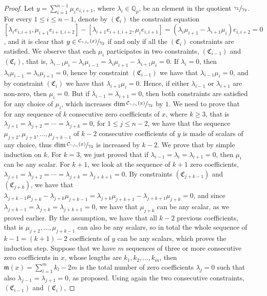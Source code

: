 \documentclass[12pt,fleqn]{article}
\begin{document}
\begin{proof}
Let $y=\sum_{i=1}^{n-1}\mu_i e_{i,i+1}$, where $\lambda_i\in\mathbb{Q}_p$, be an element in the quotient $\sfrac{\gamma_1}{\gamma_2}$.
For every $1\leq i\leq n-1$, denote by $(\mathfrak{C}_i)$ the constraint equation $[\lambda_i e_{i,i+1},\mu_{i+1}e_{i+1,i+2}]-[\lambda_{i+1}e_{i+1,i+2},\mu_i e_{i,i+1}]=(\lambda_i\mu_{i+1}-\lambda_{i+1}\mu_i)e_{i,i+2}=0$, and it is clear that $y\in\sfrac{\mathcal{C}_{\sfrac{\gamma_1}{\gamma_3}}(x)}{\gamma_2}$ if and only if all the $(\mathfrak{C}_i)$ constraints are satisfied. We observe that each $\mu_i$ participates in two constraints, $(\mathfrak{C}_{i-1})$ and $(\mathfrak{C}_i)$, that is, $\lambda_{i-1}\mu_i-\lambda_i\mu_{i-1}=\lambda_i\mu_{i+1}-\lambda_{i+1}\mu_i=0$. If $\lambda_i=0$, then $\lambda_i\mu_{i-1}=\lambda_i\mu_{i+1}=0$, hence by constraint $(\mathfrak{C}_{i-1})$ we have that $\lambda_{i-1}\mu_i=0$, and by constraint $(\mathfrak{C}_i)$ we have that $\lambda_{i+1}\mu_i=0$. Hence, if either $\lambda_{i-1}$ or $\lambda_{i+1}$ are non-zero, then $\mu_i=0$. But if $\lambda_{i-1}=\lambda_{i+1}=0$, then both constraints are satisfied for any choice of $\mu_i$, which increases $\dim\sfrac{\mathcal{C}_{\sfrac{\gamma_1}{\gamma_3}}(x)}{\gamma_2}$ by $1$. We need to prove that for any sequence of $k$ consecutive zero coefficients of $x$, where $k\geq 3$, that is $\lambda_{j+1}=\lambda_{j+2}=\cdots=\lambda_{j+k}=0$, for $1\leq j\leq n-2$, we have that the sequence $\mu_{j+2},\mu_{j+3},\dots,\mu_{j+k-1}$ of $k-2$ consecutive coefficients of $y$ is made of scalars of any choice, thus $\dim\sfrac{\mathcal{C}_{\sfrac{\gamma_1}{\gamma_3}}(x)}{\gamma_2}$ is increased by $k-2$. We prove that by simple induction on $k$. For $k=3$, we just proved that if $\lambda_{i-1}=\lambda_i=\lambda_{i+1}=0$, then $\mu_i$ can be any scalar. For $k+1$, we look at the sequence of $k+1$ zero coefficients, $\lambda_{j+1}=\lambda_{j+2}=\cdots=\lambda_{j+k}=\lambda_{j+k+1}=0$. By constraints $(\mathfrak{C}_{j+k-1})$ and $(\mathfrak{C}_{j+k})$, we have that $\lambda_{j+k-1}\mu_{j+k}-\lambda_{j+k}\mu_{j+k-1}=\lambda_{j+k}\mu_{j+k+1}-\lambda_{j+k+1}\mu_{j+k}=0$, and since $\lambda_{j+k-1}=\lambda_{j+k}=\lambda_{j+k+1}=0$, we have that $\mu_{j+k}$ can be any scalar, as we proved earlier. By the assumption, we have that all $k-2$ previous coefficients, that is $\mu_{j+2},\dots,\mu_{j+k-1}$ can also be any scalars, so in total the whole sequence of $k-1=(k+1)-2$ coefficients of $y$ can be any scalars, which proves the induction step. Suppose that we have $m$ sequences of three or more consecutive zero coefficients in $x$, whose lengths are $k_1,k_2,\dots,k_m$, then $\mathfrak{m}(x)=\sum_{l=1}^m k_l-2m$ is the total number of zero coefficients $\lambda_j=0$ such that also $\lambda_{j-1}=\lambda_{j+1}=0$, as proposed. Using again the two consecutive constraints, $(\mathfrak{C}_{i-1})$ and $(\mathfrak{C}_i)$,

\end{proof}
\end{document}
